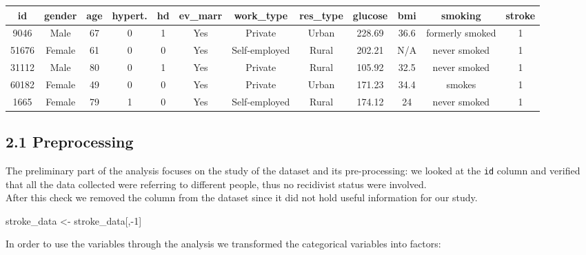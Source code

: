 \documentclass[
]{article}
\newenvironment{Shaded}{\begin{snugshade}}{\end{snugshade}}
\newcommand{\DecValTok}[1]{\textcolor[rgb]{0.00,0.00,0.81}{#1}}
\newcommand{\NormalTok}[1]{#1}
\newcommand{\OtherTok}[1]{\textcolor[rgb]{0.56,0.35,0.01}{#1}}
\newcommand{\SpecialCharTok}[1]{\textcolor[rgb]{0.00,0.00,0.00}{#1}}
\begin{document}
\begin{longtable}[]{@{}cccccccccccc@{}}
\toprule
id & gender & age & hypert. & hd & ev\_marr & work\_type & res\_type &
glucose & bmi & smoking & stroke \\
\midrule
\endhead
9046 & Male & 67 & 0 & 1 & Yes & Private & Urban & 228.69 & 36.6 &
formerly smoked & 1 \\
51676 & Female & 61 & 0 & 0 & Yes & Self-employed & Rural & 202.21 & N/A
& never smoked & 1 \\
31112 & Male & 80 & 0 & 1 & Yes & Private & Rural & 105.92 & 32.5 &
never smoked & 1 \\
60182 & Female & 49 & 0 & 0 & Yes & Private & Urban & 171.23 & 34.4 &
smokes & 1 \\
1665 & Female & 79 & 1 & 0 & Yes & Self-employed & Rural & 174.12 & 24 &
never smoked & 1 \\
\bottomrule
\end{longtable}

\hypertarget{preprocessing}{%
\subsection{2.1 Preprocessing}\label{preprocessing}}

The preliminary part of the analysis focuses on the study of the dataset
and its pre-processing: we looked at the \texttt{id} column and verified
that all the data collected were referring to different people, thus no
recidivist status were involved.\\
After this check we removed the column from the dataset since it did not
hold useful information for our study.

\begin{Shaded}
\begin{Highlighting}[]
\NormalTok{stroke\_data }\OtherTok{\textless{}{-}}\NormalTok{ stroke\_data[,}\SpecialCharTok{{-}}\DecValTok{1}\NormalTok{]}
\end{Highlighting}
\end{Shaded}

In order to use the variables through the analysis we transformed the
categorical variables into factors:
\end{document}

